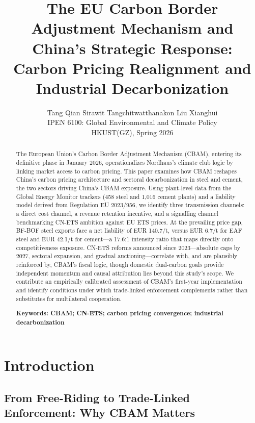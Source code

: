 \documentclass[letterpaper, 10pt, conference]{ieeeconf}
\title{\LARGE \bf
The EU Carbon Border Adjustment Mechanism and China's Strategic Response:
Carbon Pricing Realignment and Industrial Decarbonization
}
\author{Tang Qian \quad Sirawit Tangchitwatthanakon \quad Liu Xianghui \\
IPEN 6100: Global Environmental and Climate Policy \\
HKUST(GZ), Spring 2026
}
\begin{document}
\maketitle
\thispagestyle{fancy} 



\begin{abstract}
\normalfont
The European Union's Carbon Border Adjustment Mechanism (CBAM), entering its definitive phase in January 2026, operationalizes Nordhaus's climate club logic by linking market access to carbon pricing. This paper examines how CBAM reshapes China's carbon pricing architecture and sectoral decarbonization in steel and cement, the two sectors driving China's CBAM exposure. Using plant-level data from the Global Energy Monitor trackers (458 steel and 1{,}016 cement plants) and a liability model derived from Regulation EU 2023/956, we identify three transmission channels: a direct cost channel, a revenue retention incentive, and a signalling channel benchmarking CN-ETS ambition against EU ETS prices. At the prevailing price gap, BF-BOF steel exports face a net liability of EUR 140.7/t, versus EUR 6.7/t for EAF steel and EUR 42.1/t for cement---a 17.6:1 intensity ratio that maps directly onto competitiveness exposure. CN-ETS reforms announced since 2023---absolute caps by 2027, sectoral expansion, and gradual auctioning---correlate with, and are plausibly reinforced by, CBAM's fiscal logic, though domestic dual-carbon goals provide independent momentum and causal attribution lies beyond this study's scope. We contribute an empirically calibrated assessment of CBAM's first-year implementation and identify conditions under which trade-linked enforcement complements rather than substitutes for multilateral cooperation.

\medskip
\textbf{Keywords: CBAM; CN-ETS; carbon pricing convergence; industrial decarbonization}
\end{abstract}
\section{Introduction}

\subsection{From Free-Riding to Trade-Linked Enforcement: Why CBAM Matters}
\end{document}
